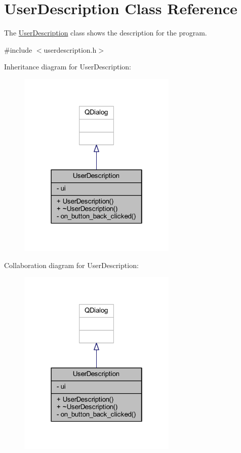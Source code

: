 \hypertarget{class_user_description}{}\section{User\+Description Class Reference}
\label{class_user_description}


The \hyperlink{class_user_description}{User\+Description} class shows the description for the program.  




{\ttfamily \#include $<$userdescription.\+h$>$}



Inheritance diagram for User\+Description\+:
\nopagebreak
\begin{figure}[H]
\begin{center}
\leavevmode
\includegraphics[width=214pt]{class_user_description__inherit__graph}
\end{center}
\end{figure}


Collaboration diagram for User\+Description\+:
\nopagebreak
\begin{figure}[H]
\begin{center}
\leavevmode
\includegraphics[width=214pt]{class_user_description__coll__graph}
\end{center}
\end{figure}
